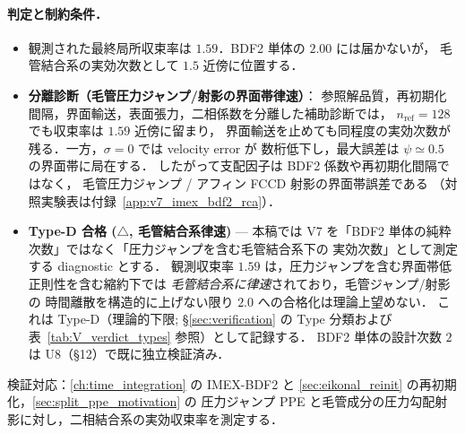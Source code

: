 \paragraph{判定と制約条件．}
\begin{itemize}\setlength{\itemsep}{0pt}
  \item 観測された最終局所収束率は $\mathbf{1.59}$．BDF2 単体の $2.00$ には届かないが，
        毛管結合系の実効次数として $1.5$ 近傍に位置する．
  \item \textbf{分離診断（毛管圧力ジャンプ/射影の界面帯律速）}：
        参照解品質，再初期化間隔，界面輸送，表面張力，二相係数を分離した補助診断では，
        $n_{\mathrm{ref}}=128$ でも収束率は $1.59$ 近傍に留まり，
        界面輸送を止めても同程度の実効次数が残る．一方，$\sigma=0$ では velocity error が
        数桁低下し，最大誤差は $\psi\simeq0.5$ の界面帯に局在する．
        したがって支配因子は BDF2 係数や再初期化間隔ではなく，
        毛管圧力ジャンプ / アフィン FCCD 射影の界面帯誤差である
        （対照実験表は付録~\ref{app:v7_imex_bdf2_rca}）．
  \item \textbf{Type-D 合格 ($\triangle$, 毛管結合系律速)} —
        本稿では V7 を「BDF2 単体の純粋次数」ではなく「圧力ジャンプを含む毛管結合系下の
        実効次数」として測定する diagnostic とする．
        観測収束率 $1.59$ は，圧力ジャンプを含む界面帯低正則性を含む縮約下では
        \emph{毛管結合系に律速}されており，毛管ジャンプ/射影の
        時間離散を構造的に上げない限り $2.0$ への合格化は理論上望めない．
        これは Type-D（理論的下限; §\ref{sec:verification} の
        Type 分類および表~\ref{tab:V_verdict_types} 参照）として記録する．
        BDF2 単体の設計次数 $2$ は U8（§12）で既に独立検証済み．
\end{itemize}
検証対応：\autoref{ch:time_integration} の IMEX-BDF2 と
\autoref{sec:eikonal_reinit} の再初期化，\autoref{sec:split_ppe_motivation} の
圧力ジャンプ PPE と毛管成分の圧力勾配射影に対し，二相結合系の実効収束率を測定する．

\FloatBarrier
